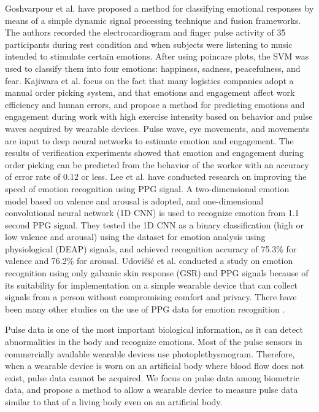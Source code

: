 \documentclass[sigchi,authordraft]{acmart}
\begin{document}
Goshvarpour et al. \cite{emotion_recognition1} have proposed a method for classifying emotional responses by means of a simple dynamic signal processing technique and fusion frameworks. The authors recorded the electrocardiogram and finger pulse activity of 35 participants during rest condition and when subjects were listening to music intended to stimulate certain emotions. After using poincare plots, the SVM was used to classify them into four emotions: happiness, sadness, peacefulness, and fear.
Kajiwara et al. \cite{emotion_recognition2} focus on the fact that many logistics companies adopt a manual order picking system, and that emotions and engagement affect work efficiency and human errors, and propose a method for predicting emotions and engagement during work with high exercise intensity based on behavior and pulse waves acquired by wearable devices. Pulse wave, eye movements, and movements are input to deep neural networks to estimate emotion and engagement. The results of verification experiments showed that emotion and engagement during order picking can be predicted from the behavior of the worker with an accuracy of error rate of 0.12 or less.
Lee et al. \cite{emotion_recognition3} have conducted research on improving the speed of emotion recognition using PPG signal. A two-dimensional emotion model based on valence and arousal is adopted, and one-dimensional convolutional neural network (1D CNN) is used to recognize emotion from 1.1 second PPG signal. They tested the 1D CNN as a binary classification (high or low valence and arousal) using the dataset for emotion analysis using physiological (DEAP) signals, and achieved recognition accuracy of 75.3\% for valence and 76.2\% for arousal.
Udovi\v{c}i\'{c} et al. \cite{emotion_recognition4} conducted a study on emotion recognition using only galvanic skin response (GSR) and PPG signals because of its suitability for implementation on a simple wearable device that can collect signals from a person without compromising comfort and privacy.
There have been many other studies on the use of PPG data for emotion recognition \cite{emotion_recognition5, emotion_recognition6, emotion_recognition7}.\par

Pulse data is one of the most important biological information, as it can detect abnormalities in the body and recognize emotions. Most of the pulse sensors in commercially available wearable devices use photoplethysmogram. Therefore, when a wearable device is worn on an artificial body where blood flow does not exist, pulse data cannot be acquired. We focus on pulse data among biometric data, and propose a method to allow a wearable device to measure pulse data similar to that of a living body even on an artificial body.
\end{document}
